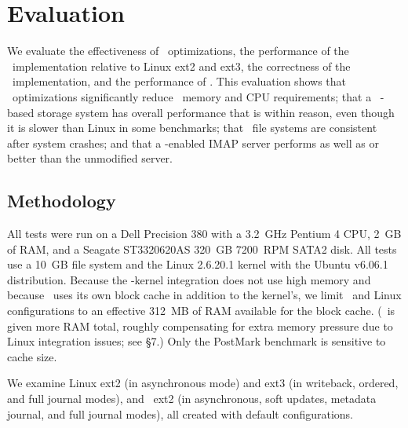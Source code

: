 
\section {Evaluation}
\label{sec:evaluation}
\label{eval}

We evaluate
%
the effectiveness of \patch\ optimizations,
%
the performance of the \Kudos\ implementation relative to Linux ext2
and ext3,
%
the correctness of the \Kudos\ implementation,
%
and the performance of \patchgroups.
%
This evaluation shows
%
that \patch\ optimizations significantly reduce \patch\ memory and CPU
requirements;
%
that a \Kudos\ \patch-based storage system has overall performance
that is within reason, even though it is slower than Linux in some
benchmarks;
%
that \Kudos\ file systems are consistent after system crashes;
%
and that a \patchgroup-enabled IMAP server performs as well as or
better than the unmodified server.

\subsection{Methodology}

All tests were run on a Dell Precision 380 with a 3.2~GHz Pentium 4
CPU, 2~GB of RAM, and a Seagate ST3320620AS 320~GB 7200~RPM SATA2 disk.
%
All tests use a 10~GB file system and the Linux 2.6.20.1 kernel
with the Ubuntu v6.06.1 distribution.
%
Because the \Kudos-kernel integration does not use high memory and
because \Kudos\ uses its own block cache in addition to the kernel's,
we limit \Kudos\ and Linux configurations to an effective 312~MB of
RAM available for the block cache.
%
(\Kudos\ is given more RAM total, roughly compensating for extra memory
pressure due to Linux integration issues; see \S7.)
%
Only the PostMark benchmark is sensitive to cache size.


We examine Linux ext2 (in asynchronous mode) and ext3 (in writeback,
ordered, and full journal modes), and \Kudos\ ext2 (in asynchronous,
soft updates, metadata journal, and full journal modes), all created
with default configurations.

